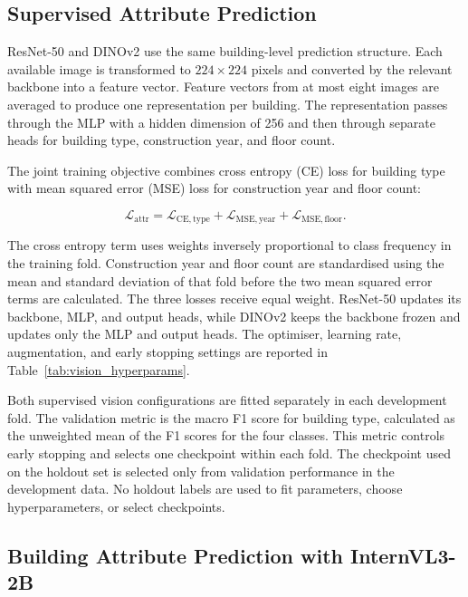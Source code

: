 \subsection{Supervised Attribute Prediction}
\label{sec:supervised_attribute_prediction}

ResNet-50 and DINOv2 use the same building-level prediction structure.
Each available image is transformed to $224 \times 224$ pixels and converted by the relevant backbone into a feature vector.
Feature vectors from at most eight images are averaged to produce one representation per building.
The representation passes through the \acs{MLP} with a hidden dimension of 256 and then through separate heads for building type, construction year, and floor count.

The joint training objective combines cross entropy (CE) loss for building type with mean squared error (MSE) loss for construction year and floor count:

\begin{equation}
	\label{eq:attr_loss}
	\mathcal{L}_{\mathrm{attr}}
	= \mathcal{L}_{\mathrm{CE,type}}
	+ \mathcal{L}_{\mathrm{MSE,year}}
	+ \mathcal{L}_{\mathrm{MSE,floor}} .
\end{equation}

The cross entropy term uses weights inversely proportional to class frequency in the training fold.
Construction year and floor count are standardised using the mean and standard deviation of that fold before the two mean squared error terms are calculated.
The three losses receive equal weight.
ResNet-50 updates its backbone, \ac{MLP}, and output heads, while DINOv2 keeps the backbone frozen and updates only the \ac{MLP} and output heads.
The optimiser, learning rate, augmentation, and early stopping settings are reported in Table~\ref{tab:vision_hyperparams}.

Both supervised vision configurations are fitted separately in each development fold.
The validation metric is the macro F1 score for building type, calculated as the unweighted mean of the F1 scores for the four classes.
This metric controls early stopping and selects one checkpoint within each fold.
The checkpoint used on the holdout set is selected only from validation performance in the development data.
No holdout labels are used to fit parameters, choose hyperparameters, or select checkpoints.

\subsection{Building Attribute Prediction with InternVL3-2B}
\label{sec:vlm_attribute_inference}

